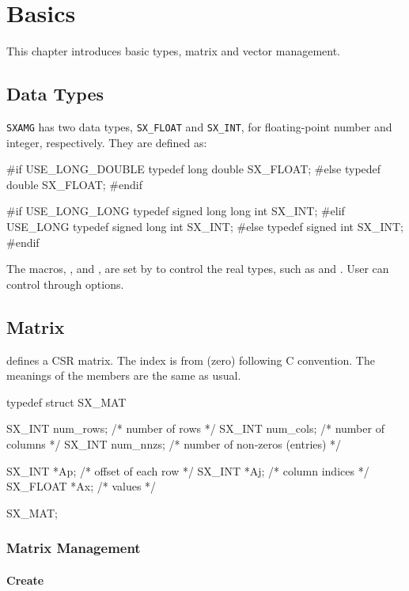 
\chapter{Basics}

This chapter introduces basic types, matrix and vector management.

\section{Data Types}

\verb|SXAMG| has two data types, \verb|SX_FLOAT| and \verb|SX_INT|, for floating-point number
and integer, respectively. They are defined as:
\begin{evb}
#if USE_LONG_DOUBLE
typedef long double              SX_FLOAT;
#else
typedef double                   SX_FLOAT;
#endif

#if USE_LONG_LONG
typedef signed long long int     SX_INT;
#elif USE_LONG
typedef signed long int          SX_INT;
#else
typedef signed int               SX_INT;
#endif

\end{evb}

The macros, ,  and , are set by  to
control the real types, such as  and . 
User can control through   options.

\section{Matrix}
 defines a CSR matrix. The index is from  (zero) following C convention. 
The meanings of the members are the same as usual.
\begin{evb}
typedef struct SX_MAT
{
    SX_INT num_rows;   /* number of rows */
    SX_INT num_cols;   /* number of columns */
    SX_INT num_nnzs;   /* number of non-zeros (entries) */

    SX_INT   *Ap;      /* offset of each row */
    SX_INT   *Aj;      /* column indices */
    SX_FLOAT *Ax;      /* values */

} SX_MAT;
\end{evb}

\subsection{Matrix Management}

\subsubsection{Create}

